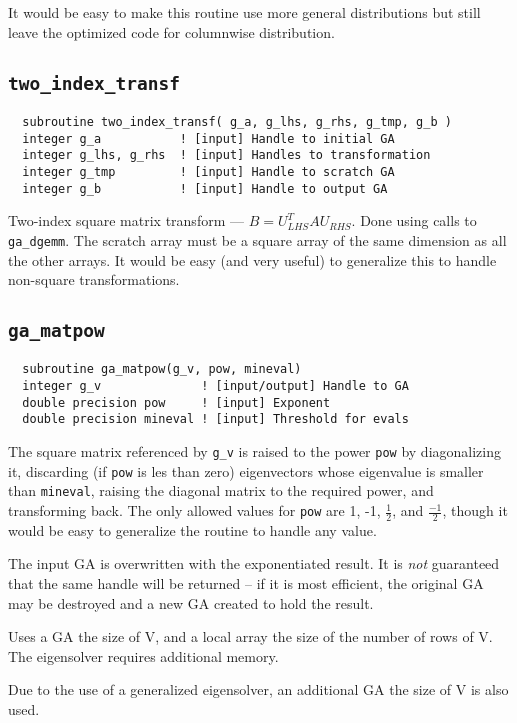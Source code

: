 It would be easy to make this routine use more general distributions
but still leave the optimized code for columnwise distribution.

\subsection{{\tt two\_index\_transf}}
\begin{verbatim}
  subroutine two_index_transf( g_a, g_lhs, g_rhs, g_tmp, g_b )
  integer g_a           ! [input] Handle to initial GA
  integer g_lhs, g_rhs  ! [input] Handles to transformation
  integer g_tmp         ! [input] Handle to scratch GA
  integer g_b           ! [input] Handle to output GA
\end{verbatim}
Two-index square matrix transform --- $B = U_{LHS}^T A U_{RHS}$.  Done
using calls to \verb+ga_dgemm+.  The scratch array must be a square
array of the same dimension as all the other arrays.  It would be easy
(and very useful) to generalize this to handle non-square transformations.

\subsection{{\tt ga\_matpow}}
\begin{verbatim}
  subroutine ga_matpow(g_v, pow, mineval)
  integer g_v              ! [input/output] Handle to GA
  double precision pow     ! [input] Exponent
  double precision mineval ! [input] Threshold for evals
\end{verbatim}
The square matrix referenced by \verb+g_v+ is raised to the power
\verb+pow+ by diagonalizing it, discarding (if \verb+pow+ is les than
zero) eigenvectors whose eigenvalue is smaller than \verb+mineval+,
raising the diagonal matrix to the required power, and transforming
back.  The only allowed values for \verb+pow+ are 1, -1,
$\frac{1}{2}$, and $\frac{-1}{2}$, though it would be easy to
generalize the routine to handle any value.

The input GA is overwritten with the exponentiated result.  It is {\em
not} guaranteed that the same handle will be returned -- if it is most
efficient, the original GA may be destroyed and a new GA created to
hold the result.

Uses a GA the size of V, and a local array the size of the number
of rows of V.  The eigensolver requires additional memory.

Due to the use of a generalized eigensolver, an additional GA the size
of V is also used.

